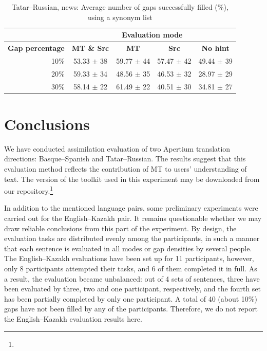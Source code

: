 \documentclass[11pt]{article}
\begin{document}
\begin{table}
\centering
\begin{tabular}{|r |*{4}{c}|}
\hline
  &\multicolumn{4}{c|}{\textbf{Evaluation mode}}\\
\hline
\textbf{Gap percentage} & \textbf{MT \& Src} & \textbf{MT} & \textbf{Src} & \textbf{No hint} \\
\hline
10\%&53.33 \(\pm\) 38&59.77 \(\pm\) 44&57.47 \(\pm\) 42&49.44 \(\pm\) 39\\
20\%&59.33 \(\pm\) 34&48.56 \(\pm\) 35&46.53 \(\pm\) 32&28.97 \(\pm\) 29\\
30\%&58.14 \(\pm\) 22&61.49 \(\pm\) 22&40.51 \(\pm\) 30&34.81 \(\pm\) 27\\
\hline
\end{tabular}
\caption {Tatar--Russian, news: Average number of gaps successfully filled (\%), using a synonym list} 
\label{table:rus-news} 
\end{table}

\section{Conclusions}
\label{sec:conclusion}
We have conducted assimilation evaluation of two Apertium translation directions: Basque--Spanish and Tatar--Russian. The results suggest that this evaluation method reflects the contribution of MT to users' understanding of text. The version of the toolkit used in this 
experiment may be downloaded from our repository.\footnote{}

In addition to the mentioned language pairs, some preliminary experiments were carried out for the English--Kazakh pair. It remains questionable whether we may draw reliable conclusions from this part of the experiment. By design, the evaluation tasks are distributed evenly among the participants, in such a manner that each sentence is evaluated in all modes or gap densities by several people. The English--Kazakh evaluations have been set up for 11 participants, however, only 8 participants attempted their tasks, and 6 of them completed it in full. As a result, the evaluation became unbalanced: out of 4 sets of sentences, three have been evaluated by three, two and one participant, respectively, and the fourth set has been partially completed by only one participant. A total of 40 (about 10\%) gaps have not been filled by any of the participants. Therefore, we do not report the English--Kazakh evaluation results here.
\end{document}
